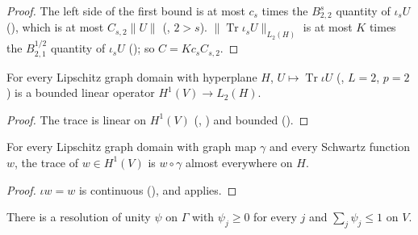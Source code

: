 \begin{proof}
\leanok
The left side of the first bound is at most $c_s$ times the $B^s_{2,2}$ quantity of $\iota_s U$
(), which is at most $C_{s,2} \|U\|$
(, $2 > s$). $\|\operatorname{Tr} \iota_s U\|_{L_2(H)}$ is at
most $K$ times the $B^{1/2}_{2,1}$ quantity of $\iota_s U$ (); so
$C = K c_s C_{s,2}$.
\end{proof}

\begin{lemma}
\label{lem:graph-trace-sobolev-one-operator}
\leanok
{}
For every Lipschitz graph domain with hyperplane $H$, $U \mapsto \operatorname{Tr} \iota U$
(, $L = 2$, $p = 2$) is a bounded linear operator $H^1(V) \to L_2(H)$.
\end{lemma}

\begin{proof}
\leanok
The trace is linear on $H^1(V)$ (, )
and bounded ().
\end{proof}

\begin{lemma}
\label{lem:graph-trace-schwartz}
\leanok
{}
For every Lipschitz graph domain with graph map $\gamma$ and every Schwartz function $w$, the
trace of $w \in H^1(V)$ is $w \circ \gamma$ almost everywhere on $H$.
\end{lemma}

\begin{proof}
\leanok
$\iota w = w$ is continuous (), and 
applies.
\end{proof}

\begin{lemma}
\label{lem:resolution-of-unity-nonneg}
\leanok
{}
There is a resolution of unity $\psi$ on $\Gamma$ with $\psi_j \geq 0$ for every $j$ and
$\sum_j \psi_j \leq 1$ on $V$.
\end{lemma}

